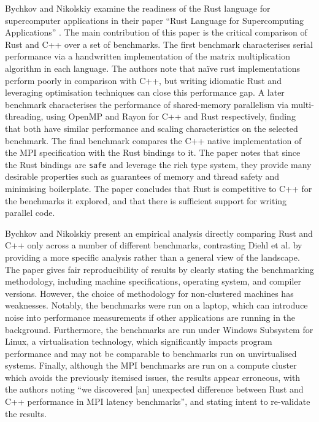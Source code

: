 Bychkov and Nikolskiy examine the readiness of the Rust language for supercomputer applications in their paper ``Rust Language for Supercomputing Applications'' \cite{bychkovRustLanguageSupercomputing2021}. The main contribution of this paper is the critical comparison of Rust and C++ over a set of benchmarks. The first benchmark characterises serial performance via a handwritten implementation of the matrix multiplication algorithm in each language. The authors note that na\"ive rust implementations perform poorly in comparison with C++, but writing idiomatic Rust and leveraging optimisation techniques can close this performance gap. A later benchmark characterises the performance of shared-memory parallelism via multi-threading, using OpenMP and Rayon for C++ and Rust respectively, finding that both have similar performance and scaling characteristics on the selected benchmark. The final benchmark compares the C++ native implementation of the MPI specification with the Rust bindings to it. The paper notes that since the Rust bindings are \texttt{safe} and leverage the rich type system, they provide many desirable properties such as guarantees of memory and thread safety and minimising boilerplate. The paper concludes that Rust is competitive to C++ for the benchmarks it explored, and that there is sufficient support for writing parallel code.

Bychkov and Nikolskiy present an empirical analysis directly comparing Rust and C++ only across a number of different benchmarks, contrasting Diehl et al. by providing a more specific analysis rather than a general view of the landscape. The paper gives fair reproducibility of results by clearly stating the benchmarking methodology, including machine specifications, operating system, and compiler versions. However, the choice of methodology for non-clustered machines has weaknesses. Notably, the benchmarks were run on a laptop, which can introduce noise into performance measurements if other applications are running in the background. Furthermore, the benchmarks are run under Windows Subsystem for Linux, a virtualisation technology, which significantly impacts program performance and may not be comparable to benchmarks run on unvirtualised systems. Finally, although the MPI benchmarks are run on a compute cluster which avoids the previously itemised issues, the results appear erroneous, with the authors noting ``we discovered [an] unexpected difference between Rust and C++ performance in MPI latency benchmarks'', and stating intent to re-validate the results.


